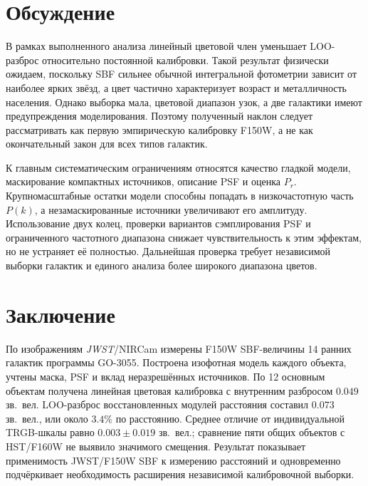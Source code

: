 \section{Обсуждение}

В рамках выполненного анализа линейный цветовой член уменьшает LOO-разброс относительно постоянной калибровки. Такой результат физически ожидаем, поскольку SBF сильнее обычной интегральной фотометрии зависит от наиболее ярких звёзд, а цвет частично характеризует возраст и металличность населения. Однако выборка мала, цветовой диапазон узок, а две галактики имеют предупреждения моделирования. Поэтому полученный наклон следует рассматривать как первую эмпирическую калибровку F150W, а не как окончательный закон для всех типов галактик.

К главным систематическим ограничениям относятся качество гладкой модели, маскирование компактных источников, описание PSF и оценка $P_r$. Крупномасштабные остатки модели способны попадать в низкочастотную часть $P(k)$, а незамаскированные источники увеличивают его амплитуду. Использование двух колец, проверки вариантов сэмплирования PSF и ограниченного частотного диапазона снижает чувствительность к этим эффектам, но не устраняет её полностью. Дальнейшая проверка требует независимой выборки галактик и единого анализа более широкого диапазона цветов.

\section{Заключение}

По изображениям \textit{JWST}/NIRCam измерены F150W SBF-величины 14 ранних галактик программы GO-3055. Построена изофотная модель каждого объекта, учтены маска, PSF и вклад неразрешённых источников. По 12 основным объектам получена линейная цветовая калибровка с внутренним разбросом $0.049$ зв.~вел. LOO-разброс восстановленных модулей расстояния составил $0.073$ зв.~вел., или около $3.4\%$ по расстоянию. Среднее отличие от индивидуальной TRGB-шкалы равно $0.003\pm0.019$ зв.~вел.; сравнение пяти общих объектов с HST/F160W не выявило значимого смещения. Результат показывает применимость JWST/F150W SBF к измерению расстояний и одновременно подчёркивает необходимость расширения независимой калибровочной выборки.

